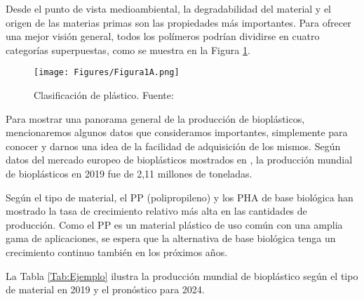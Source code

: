 \documentclass[14pt,oneside]{extarticle} %
\begin{document}
Desde el punto de vista medioambiental, la degradabilidad del material y el origen de las materias primas son las propiedades más importantes. Para ofrecer una mejor visión general, todos los polímeros podrían dividirse en cuatro categorías superpuestas, como se muestra en la Figura \ref{fig:Clasificación}.

\begin{figure}[H]
    \centering
    \texttt{[image: Figures/Figura1A.png]}
    \caption{ Clasificación de plástico. Fuente: \cite{joogi2020}}
    \label{fig:Clasificación}
\end{figure}

Para mostrar una panorama general de la producción de bioplásticos, mencionaremos algunos datos que consideramos importantes, simplemente para conocer y darnos una idea de la facilidad de adquisición de los mismos. Según datos del mercado europeo de bioplásticos mostrados en \cite{joogi2020}, la producción mundial de bioplásticos en  2019 fue de 2,11 millones de toneladas. 

Según el tipo de material, el PP (polipropileno) y los PHA de base biológica han mostrado la tasa  de crecimiento relativo más alta en las cantidades de producción. Como el PP es un material  plástico de uso común con una amplia gama de aplicaciones, se espera que la alternativa de base  biológica tenga un crecimiento continuo también en los próximos años. 

La Tabla \ref{Tab:Ejemplo} ilustra la producción mundial de bioplástico según el tipo de material en 2019 y el  pronóstico para 2024. 
\end{document}
